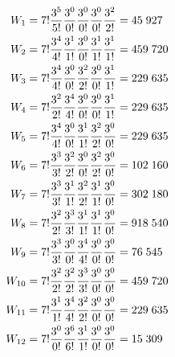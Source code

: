 \documentclass[../../../Main.tex]{subfiles}
\begin{document}
\begin{align*}
    W_1&=7!\five\zero\zero\zero\two=45\;927\\
    W_2&=7!\four\one\zero\one\one=459\;720\\
    W_3&=7!\four\zero\two\zero\one=229\;635\\
    W_4&=7!\two\four\zero\zero\one=229\;635\\
    W_5&=7!\four\zero\one\two\zero=229\;635\\
    W_6&=7!\three\two\zero\two\zero=102\;160\\
    W_7&= 7!\three\one\two\one\zero=302\;180\\
    W_8&=7!\two\three\one\one\zero=918\;540 \\
    W_9&=7!\three\zero\four\zero\zero =76\;545\\
    W_{10}&=7!\two\two\three\zero\zero =459\;720\\
    W_{11}&=7!\one\four\two\zero\zero =229\;635\\
    W_{12}&=7!\zero\six\one\zero\zero =15\;309
\end{align*}
\end{document}
